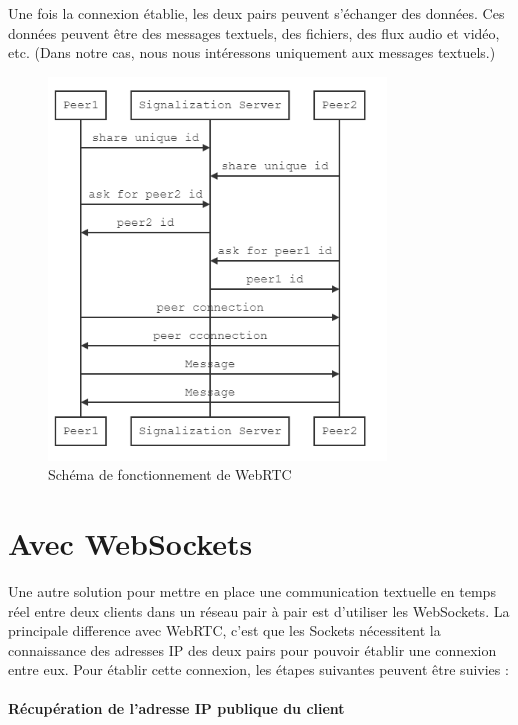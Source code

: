 Une fois la connexion établie, les deux pairs peuvent s'échanger des données. Ces données peuvent être des messages textuels, des fichiers, des flux audio et vidéo, etc. 
(Dans notre cas, nous nous intéressons uniquement aux messages textuels.)


\begin{figure}[h]
    \centering
    \includegraphics[width=0.8\textwidth]{assets/webrtc_connection.png}
    \caption{Schéma de fonctionnement de WebRTC}
    \label{fig:webrtc}
\end{figure}

\newpage 

\section{Avec WebSockets}

Une autre solution pour mettre en place une communication textuelle en temps réel entre deux clients dans un réseau pair à pair est d'utiliser les WebSockets.
La principale difference avec WebRTC, c'est que les Sockets nécessitent la connaissance des adresses IP des deux pairs pour pouvoir établir une connexion entre eux.
Pour établir cette connexion, les étapes suivantes peuvent être suivies :

\paragraph{Récupération de l'adresse IP publique du client}

